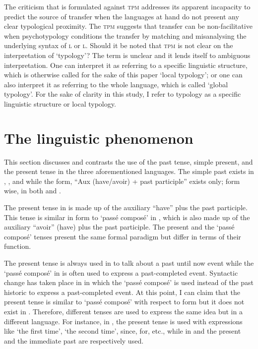 \documentclass[output=paper,
modfonts
]{langscibook}
\begin{document}
The criticism that is formulated against \textsc{tpm} addresses its apparent incapacity to predict the source of transfer when the languages at hand do not present any clear typological proximity. The \textsc{tpm} suggests that transfer can be non-facilitative when psychotypology conditions the transfer by matching and misanalysing the underlying syntax of \textsc{l} or \textsc{l}.  Should it be noted that \textsc{tpm} is not clear on the interpretation of ‘typology’? The term is unclear and it lends itself to ambiguous interpretation. One can interpret it as referring to a specific linguistic structure, which is otherwise called for the sake of this paper ‘local typology’; or one can also interpret it as referring to the whole language, which is called ‘global typology’. For the sake of clarity in this study, I refer to typology as a specific linguistic structure or local typology.

\section{The linguistic phenomenon}\label{sec:kabasele:3}

This section discusses and contrasts the use of the past tense, simple present, and the present  tense in the three aforementioned languages. The simple past exists in , , and  while the form, “Aux (have/avoir) + past participle” exists only; form wise, in both  and . 

The present  tense in  is made up of the auxiliary “have” plus the past participle. This tense is similar in form to ‘passé composé’ in , which is also made up of the auxiliary “avoir” (have) plus the past participle. The present  and the ‘passé composé’ tenses present the same formal paradigm but differ in terms of their function. 

The present  tense is always used in  to talk about a past until now event while the ‘passé composé’ in  is often used to express a past-completed event. Syntactic change has taken place in  in which the ‘passé composé’ is used instead of the past historic to express a past-completed event. At this point, I can claim that the  present  tense is similar to  ‘passé composé’ with respect to form but it does not exist in . Therefore, different tenses are used to express the same idea but in a different language. For instance, in , the present  tense is used with expressions like ‘the first time’, ‘the second time’, since, for, etc., while in  and  the present and the immediate past are respectively used.
\end{document}
